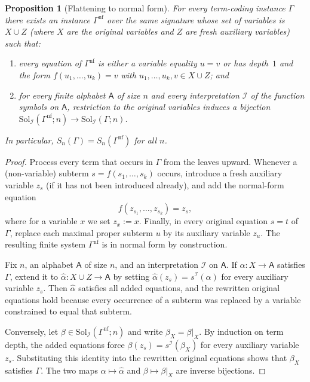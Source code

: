 \documentclass[11pt]{article}
\theoremstyle{definition}
\theoremstyle{plain}
\newtheorem{proposition}[definition]{Proposition}
\newcommand{\A}{\mathsf{A}}
\newcommand{\Sol}{\mathrm{Sol}}
\newcommand{\Sn}{S_n}
\begin{document}
\begin{proposition}[Flattening to normal form]
\label{prop:flatten}
For every term-coding instance $\Gamma$ there exists an instance $\Gamma^{\mathrm{nf}}$ over the \emph{same}
signature whose set of variables is $X\cup Z$ (where $X$ are the original variables and $Z$ are fresh
auxiliary variables) such that:
\begin{enumerate}[label=(\alph*)]
\item every equation of $\Gamma^{\mathrm{nf}}$ is either a variable equality $u=v$ or has depth~$1$ and the form
      $f(u_1,\dots,u_k)=v$ with $u_1,\dots,u_k,v\in X\cup Z$; and
\item for every finite alphabet $\A$ of size $n$ and every interpretation $\mathcal I$ of the function symbols on $\A$,
      restriction to the original variables induces a bijection
      $\Sol_\mathcal I(\Gamma^{\mathrm{nf}};n)\to \Sol_\mathcal I(\Gamma;n)$.
\end{enumerate}
In particular, $\Sn(\Gamma)=\Sn(\Gamma^{\mathrm{nf}})$ for all $n$.
\end{proposition}

\begin{proof}
Process every term that occurs in $\Gamma$ from the leaves upward.
Whenever a (non-variable) subterm $s=f(s_1,\dots,s_k)$ occurs, introduce a fresh auxiliary variable $z_s$
(if it has not been introduced already), and add the normal-form equation
\[
f(z_{s_1},\dots,z_{s_k}) = z_s,
\]
where for a variable $x$ we set $z_x:=x$.
Finally, in every original equation $s=t$ of $\Gamma$, replace each maximal proper subterm $u$ by its
auxiliary variable $z_u$.
The resulting finite system $\Gamma^{\mathrm{nf}}$ is in normal form by construction.

Fix $n$, an alphabet $\A$ of size $n$, and an interpretation $\mathcal I$ on $\A$.
If $\alpha:X\to\A$ satisfies $\Gamma$, extend it to $\widehat\alpha:X\cup Z\to\A$ by setting
$\widehat\alpha(z_s)=s^{\mathcal I}(\alpha)$ for every auxiliary variable $z_s$.
Then $\widehat\alpha$ satisfies all added equations, and the rewritten original equations hold because every
occurrence of a subterm was replaced by a variable constrained to equal that subterm.

Conversely, let $\beta\in\Sol_\mathcal I(\Gamma^{\mathrm{nf}};n)$ and write $\beta_X=\beta|_X$.
By induction on term depth, the added equations force $\beta(z_s)=s^{\mathcal I}(\beta_X)$ for every auxiliary
variable $z_s$. Substituting this identity into the rewritten original equations shows that $\beta_X$ satisfies
$\Gamma$.
The two maps $\alpha\mapsto\widehat\alpha$ and $\beta\mapsto\beta|_X$ are inverse bijections.
\end{proof}
\end{document}
